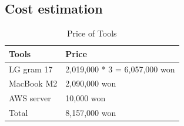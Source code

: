 \documentclass[conference]{IEEEtran}
\begin{document}
\subsection{Cost estimation}
\begin{table}[h]
\caption{Price of Tools}
\def\arraystretch{1.25} \small
    \begin{tabular}{|p{2.4cm}|p{5.0cm}|}
	\hline
	Tools & Price\\
       \hline
       LG gram 17 & 2,019,000 * 3 = 6,057,000 won\\
	\hline
       MacBook M2 & 2,090,000 won\\
	\hline
       AWS server & 10,000 won\\
	\hline
	Total & 8,157,000 won\\
	\hline
	\end{tabular}
\end{table}
\end{document}
